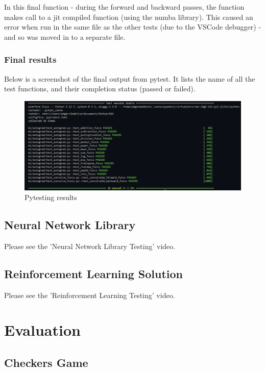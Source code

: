 \documentclass{article}
\begin{document}
    In this final function - during the forward and backward passes, the function makes call to 
    a jit compiled function (using the numba library). This caused an error when run in
    the same file as the other tests (due to the VSCode debugger) - and so was moved in to a separate file.

    \subsubsection{Final results}

    Below is a screenshot of the final output from pytest. It lists the name of all the test functions,
    and their completion status (passed or failed).

    \begin{figure}[h]
        \centering
        \includegraphics[scale=0.5]{passing_tests.png}
        \caption{Pytesting results}
    \end{figure}
     
    \subsection{Neural Network Library}

    Please see the 'Neural Network Library Testing' video.

    \subsection{Reinforcement Learning Solution}

    Please see the 'Reinforcement Learning Testing' video.

    
    \pagebreak
    \section{Evaluation}

    \subsection{Checkers Game}
\end{document}
